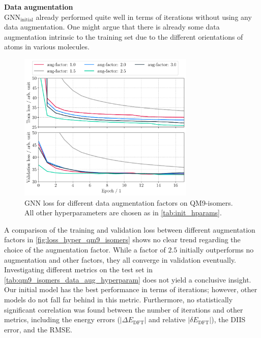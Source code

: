 \textbf{Data augmentation}\\
$\text{GNN}_\text{initial}$ already performed quite well in terms of iterations without using any data augmentation. One might argue that there is already some data augmentation intrinsic to the training set due to the different orientations of atoms in various molecules. 
\begin{figure}[H]
    \centering
    \includegraphics[width=0.75\textwidth]{../fig/application/aug_train_val_loss.pdf}
    \caption[GNN loss for different augmentation factors on QM9-isomers]{GNN loss for different data augmentation factors on QM9-isomers. All other hyperparameters are chosen as in \autoref{tab:init_hparams}.}
    \label{fig:loss_hyper_qm9_isomers}
\end{figure}
A comparison of the training and validation loss between different augmentation factors in \autoref{fig:loss_hyper_qm9_isomers} shows no clear trend regarding the choice of the augmentation factor. While a factor of $2.5$ initially outperforms no augmentation and other factors, they all converge in validation eventually. 
Investigating different metrics on the test set in \autoref{tab:qm9_isomers_data_aug_hyperparam} does not yield a conclusive insight. Our initial model has the best performance in terms of iterations; however, other models do not fall far behind in this metric. Furthermore, no statistically significant correlation was found between the number of iterations and other metrics, including the energy errors ($|\Delta E_\text{DFT}|$ and relative $|\delta E_\text{DFT}|$), the DIIS error, and the RMSE.
